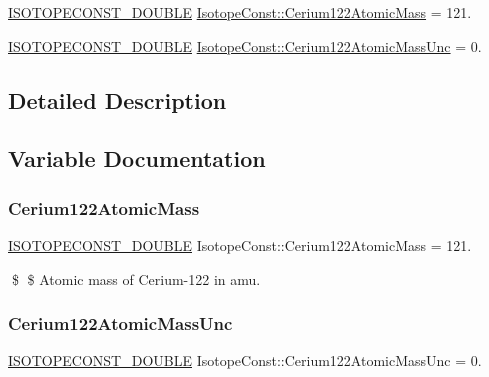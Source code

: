 \begin{DoxyCompactItemize}
\item 
\mbox{\hyperlink{group___isotope_const-_macros_ga8f45a7272ce02c0b4c65c44636ed719a}{I\+S\+O\+T\+O\+P\+E\+C\+O\+N\+S\+T\+\_\+\+D\+O\+U\+B\+LE}} \mbox{\hyperlink{group___isotope_const-_cerium-_ce122_gabf80d77365f3feceffceafcd0f12b089}{Isotope\+Const\+::\+Cerium122\+Atomic\+Mass}} = 121.
\item 
\mbox{\hyperlink{group___isotope_const-_macros_ga8f45a7272ce02c0b4c65c44636ed719a}{I\+S\+O\+T\+O\+P\+E\+C\+O\+N\+S\+T\+\_\+\+D\+O\+U\+B\+LE}} \mbox{\hyperlink{group___isotope_const-_cerium-_ce122_ga4c6bbdbd1d536af7aa28a467f59d4787}{Isotope\+Const\+::\+Cerium122\+Atomic\+Mass\+Unc}} = 0.
\end{DoxyCompactItemize}


\subsection{Detailed Description}


\subsection{Variable Documentation}
\mbox{\label{group___isotope_const-_cerium-_ce122_gabf80d77365f3feceffceafcd0f12b089}} 
\subsubsection{\texorpdfstring{Cerium122\+Atomic\+Mass}{Cerium122AtomicMass}}
{\footnotesize\ttfamily \mbox{\hyperlink{group___isotope_const-_macros_ga8f45a7272ce02c0b4c65c44636ed719a}{I\+S\+O\+T\+O\+P\+E\+C\+O\+N\+S\+T\+\_\+\+D\+O\+U\+B\+LE}} Isotope\+Const\+::\+Cerium122\+Atomic\+Mass = 121.}

\$ \$ Atomic mass of Cerium-\/122 in amu. \mbox{\label{group___isotope_const-_cerium-_ce122_ga4c6bbdbd1d536af7aa28a467f59d4787}} 
\subsubsection{\texorpdfstring{Cerium122\+Atomic\+Mass\+Unc}{Cerium122AtomicMassUnc}}
{\footnotesize\ttfamily \mbox{\hyperlink{group___isotope_const-_macros_ga8f45a7272ce02c0b4c65c44636ed719a}{I\+S\+O\+T\+O\+P\+E\+C\+O\+N\+S\+T\+\_\+\+D\+O\+U\+B\+LE}} Isotope\+Const\+::\+Cerium122\+Atomic\+Mass\+Unc = 0.}


